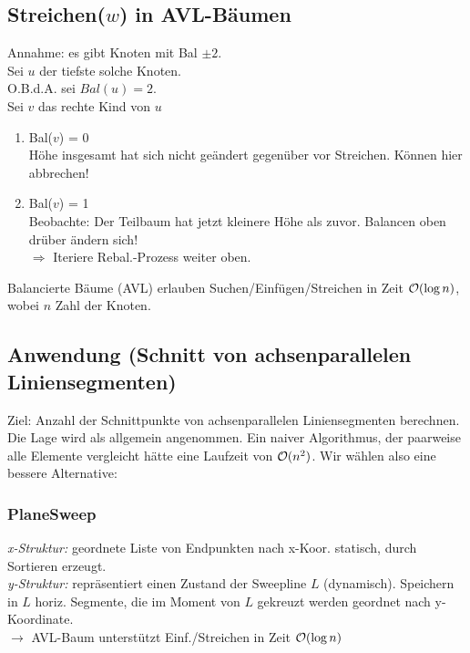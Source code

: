         
        \subsection{Streichen($w$) in AVL-Bäumen}
            Annahme: es gibt Knoten mit Bal $\pm 2$.\\
            Sei $u$ der tiefste solche Knoten.\\
            O.B.d.A. sei $Bal(u) = 2$.\\
            Sei $v$ das rechte Kind von $u$
            \begin{enumerate}
                \item Bal($v$) = 0\\
                Höhe insgesamt hat sich nicht geändert gegenüber vor Streichen. Können hier abbrechen!
                \item Bal($v$) = 1\\
                Beobachte: Der Teilbaum hat jetzt kleinere Höhe als zuvor. Balancen oben drüber ändern sich!\\
                $\Rightarrow$ Iteriere Rebal.-Prozess weiter oben.
            \end{enumerate}
            \begin{satz}
                Balancierte Bäume (AVL) erlauben Suchen/Einfügen/Streichen in Zeit $\mathcal{O}(\log n)$, wobei $n$ Zahl der Knoten.
            \end{satz}
        
        \subsection{Anwendung (Schnitt von achsenparallelen Liniensegmenten)}
            Ziel: Anzahl der Schnittpunkte von achsenparallelen Liniensegmenten berechnen. Die Lage wird als allgemein angenommen.
            Ein naiver Algorithmus, der paarweise alle Elemente vergleicht hätte eine Laufzeit von $\mathcal{O}(n^{2})$. 
            Wir wählen also eine bessere Alternative:
            
            \subsubsection{PlaneSweep}
                \emph{x-Struktur:} geordnete Liste von Endpunkten nach x-Koor. statisch, durch Sortieren erzeugt.\\
                \emph{y-Struktur:} repräsentiert einen Zustand der Sweepline $L$ (dynamisch). Speichern in $L$ horiz. Segmente, 
                die im Moment von $L$ gekreuzt werden geordnet nach y-Koordinate.\\
                $\rightarrow$ AVL-Baum unterstützt Einf./Streichen in Zeit $\mathcal{O}(\log n)$\\
                
